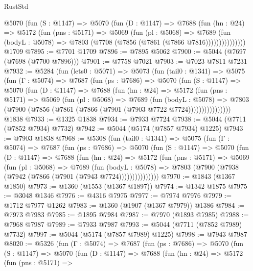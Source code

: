 \begin{lexlean}{RustStd}
\begin{coremodule}
            @5070
              (fun (S : @1147) =>
              @5070
                (fun (D : @1147) =>
                @7688
                  (fun (hn : @24) =>
                  @5172
                    (fun (pns : @5171) =>
                    @5069
                      (fun (pl : @5068) =>
                      @7689
                        (fun (bodyL : @5078) =>
                        @7803 (@7708 (@7856 (@7861 (@7866 @7816)))))))))))))))
    @1709
@7895 := @7701 @1709
@7896 := @7895 @5062
@7900 := @5044 (@7697 (@7698 (@7700 @7896)))
@7901 := @7758 @7021
@7903 := @7023 @7811 @7231
@7932 := @5284
    (fun (lets0 : @5071) =>
    @5073
      (fun (tail0 : @1341) =>
      @5075
        (fun (Γ : @5074) =>
        @7687
          (fun (ps : @7686) =>
          @5070
            (fun (S : @1147) =>
            @5070
              (fun (D : @1147) =>
              @7688
                (fun (hn : @24) =>
                @5172
                  (fun (pns : @5171) =>
                  @5069
                    (fun (pl : @5068) =>
                    @7689
                      (fun (bodyL : @5078) =>
                      @7803 (@7900 (@7856 (@7861 (@7866 (@7901 (@7903 @7722 @7724))))))))))))))))
    @1838
@7933 := @1325 @1838
@7934 := @7933 @7724
@7938 := @5044 (@7711 (@7852 @7934) @7732)
@7942 := @5044 (@5174 (@7857 @7934) @1225)
@7943 := @7903 @1838
@7968 := @5308
    (fun (tail0 : @1341) =>
    @5075
      (fun (Γ : @5074) =>
      @7687
        (fun (ps : @7686) =>
        @5070
          (fun (S : @1147) =>
          @5070
            (fun (D : @1147) =>
            @7688
              (fun (hn : @24) =>
              @5172
                (fun (pns : @5171) =>
                @5069
                  (fun (pl : @5068) =>
                  @7689
                    (fun (bodyL : @5078) =>
                    @7803 (@7900 (@7938 (@7942 (@7866 (@7901 (@7943 @7724)))))))))))))))
@7970 := @1843 (@1367 @1850)
@7973 := @1360 (@1553 (@1367 @1897))
@7974 := @1342 @1875
@7975 := @3048 @1346
@7976 := @4316 @7975
@7977 := @7974 @7976
@7979 := @1712 @7977 @1262
@7983 := @1360 (@1907 (@1367 @7979)) @1386
@7984 := @7973 @7983
@7985 := @1895 @7984
@7987 := @7970 (@1893 @7985)
@7988 := @7968 @7987
@7989 := @7933 @7987
@7993 := @5044 (@7711 (@7852 @7989) @7732)
@7997 := @5044 (@5174 (@7857 @7989) @1225)
@7998 := @7943 @7987
@8020 := @5326
    (fun (Γ : @5074) =>
    @7687
      (fun (ps : @7686) =>
      @5070
        (fun (S : @1147) =>
        @5070
          (fun (D : @1147) =>
          @7688
            (fun (hn : @24) =>
            @5172
              (fun (pns : @5171) =>

\end{coremodule}
\end{lexlean}
